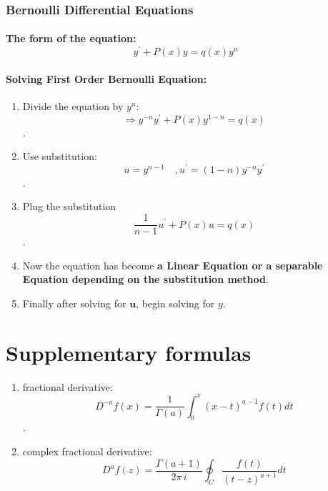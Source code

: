 \documentclass{article}
\begin{document}
\subsubsection{Bernoulli Differential Equations}
\paragraph{The form of the equation:
	\[y^{'}+P(x)y=q(x)y^{n}\]
}
\paragraph{Solving First Order Bernoulli Equation:}
\begin{enumerate}
	\item Divide the equation by $y^{n}$:
	\[\Rightarrow y^{-n}y^{'}+P(x)y^{1-n}=q(x)\].\\ \vspace{2em}
	\item Use substitution:
	\[u=y^{n-1}\quad,u^{'}=(1-n)y^{-n}y^{'}\].\\ \vspace{2em}
	\item Plug the substitution
	\[\frac{1}{n-1}u^{'}+P(x)u=q(x)\]. \\ \vspace{2em}
	\item Now the equation has become \textbf{a Linear Equation or a separable Equation depending on the substitution method}.\\ \vspace{2em}
	\item Finally after solving for $\mathbf{u}$, begin solving for $y$.
\end{enumerate}

\pagebreak
\section{Supplementary formulas}
\begin{enumerate}
	\item fractional derivative: \[D^{-a}f(x)=\frac{1}{\Gamma(a)}\int_{0}^{x}{(x-t)^{a-1}f(t)dt}\].\\ \vspace{2em}
	\item complex fractional derivative:
	\[D^{a}f(z)=\frac{\Gamma(a+1)}{2\pi\,i}\oint_{C}{\frac{f(t)}{(t-z)^{a+1}}dt}\]
\end{enumerate}
\end{document}
